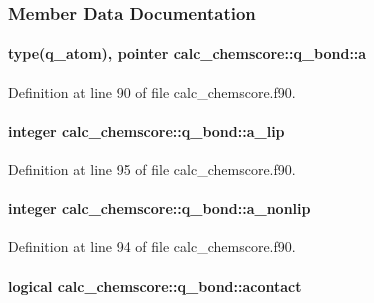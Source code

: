 \subsubsection{Member Data Documentation}
\hypertarget{structcalc__chemscore_1_1q__bond_ae06bd282fb23881744e5f028f54468f2}{
\paragraph[{a}]{\setlength{\rightskip}{0pt plus 5cm}type({\bf q\-\_\-atom}), pointer calc\-\_\-chemscore\-::q\-\_\-bond\-::a}}\label{structcalc__chemscore_1_1q__bond_ae06bd282fb23881744e5f028f54468f2}


Definition at line 90 of file calc\-\_\-chemscore.\-f90.

\hypertarget{structcalc__chemscore_1_1q__bond_a73422cfacd9c20b6d956b351dfb9ccb3}{
\paragraph[{a\-\_\-lip}]{\setlength{\rightskip}{0pt plus 5cm}integer calc\-\_\-chemscore\-::q\-\_\-bond\-::a\-\_\-lip}}\label{structcalc__chemscore_1_1q__bond_a73422cfacd9c20b6d956b351dfb9ccb3}


Definition at line 95 of file calc\-\_\-chemscore.\-f90.

\hypertarget{structcalc__chemscore_1_1q__bond_ad21ebce165a91632115adce6d34aa9a5}{
\paragraph[{a\-\_\-nonlip}]{\setlength{\rightskip}{0pt plus 5cm}integer calc\-\_\-chemscore\-::q\-\_\-bond\-::a\-\_\-nonlip}}\label{structcalc__chemscore_1_1q__bond_ad21ebce165a91632115adce6d34aa9a5}


Definition at line 94 of file calc\-\_\-chemscore.\-f90.

\hypertarget{structcalc__chemscore_1_1q__bond_a89861b90d4150ea23996db8edc60ccfa}{
\paragraph[{acontact}]{\setlength{\rightskip}{0pt plus 5cm}logical calc\-\_\-chemscore\-::q\-\_\-bond\-::acontact}}\label{structcalc__chemscore_1_1q__bond_a89861b90d4150ea23996db8edc60ccfa}


